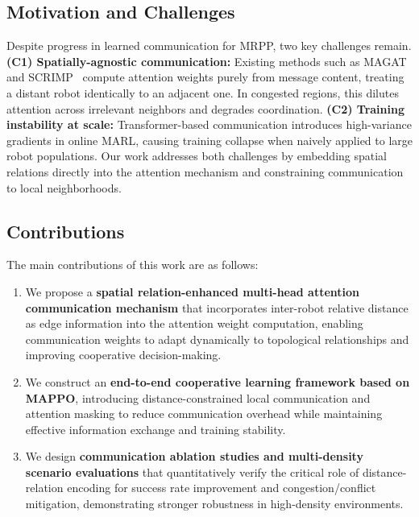 \documentclass[conference]{IEEEtran}
\begin{document}
\subsection{Motivation and Challenges}

Despite progress in learned communication for MRPP, two key
challenges remain.
\textbf{(C1) Spatially-agnostic communication:}
Existing methods such as MAGAT~\cite{li2021magat} and
SCRIMP~\cite{wang2023scrimp} compute attention weights purely from
message content, treating a distant robot identically to an
adjacent one. In congested regions, this dilutes attention across
irrelevant neighbors and degrades coordination.
\textbf{(C2) Training instability at scale:}
Transformer-based communication introduces high-variance gradients
in online MARL, causing training collapse when naively applied to
large robot populations.
Our work addresses both challenges by embedding spatial relations
directly into the attention mechanism and constraining
communication to local neighborhoods.

\subsection{Contributions}

The main contributions of this work are as follows:
\begin{enumerate}
\item We propose a \textbf{spatial relation-enhanced multi-head
      attention communication mechanism} that incorporates
      inter-robot relative distance as edge information into the
      attention weight computation, enabling communication weights
      to adapt dynamically to topological relationships and
      improving cooperative decision-making.
\item We construct an \textbf{end-to-end cooperative learning
      framework based on MAPPO}, introducing distance-constrained
      local communication and attention masking to reduce
      communication overhead while maintaining effective
      information exchange and training stability.
\item We design \textbf{communication ablation studies and
      multi-density scenario evaluations} that quantitatively
      verify the critical role of distance-relation encoding for
      success rate improvement and congestion/conflict mitigation,
      demonstrating stronger robustness in high-density
      environments.
\end{enumerate}
\end{document}
